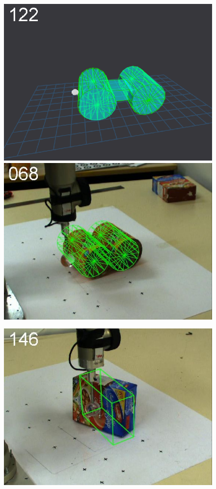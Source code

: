 \begin{figure}[tbp]
{\includegraphics[width=\imgCXwid]{images/C5_3exp_6_2}
\includegraphics[width=\imgCXwid]{images/C2_3exp_75_2}
}
\centerline{
\includegraphics[width=\imgCXwid]{images/C1_2exp_87_3}
}
\end{figure}
